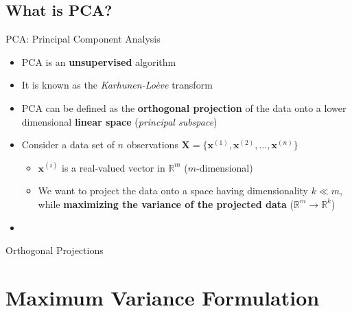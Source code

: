 \subsection{What is PCA?}

\begin{frame}{PCA: Principal Component Analysis}{}
	\begin{itemize}
		\item PCA is an \textbf{unsupervised} algorithm
		\item It is known as the \textit{Karhunen-Lo\`{e}ve} transform
		\item PCA can be defined as the \textbf{orthogonal projection} of the data onto a lower dimensional
			\textbf{linear space} (\textit{principal subspace})
		\item Consider a data set of $n$ observations $\bm{X} = \{ \bm{x}^{(1)}, \bm{x}^{(2)}, \dots, \bm{x}^{(n)} \}$
		\begin{itemize}
			\item $\bm{x}^{(i)}$ is a real-valued vector in $\mathbb{R}^m$ ($m$-dimensional)
			\item We want to project the data onto a space having dimensionality $k \ll m$, while \textbf{maximizing
				the variance of the projected data} ($\mathbb{R}^m \rightarrow \mathbb{R}^k$)
		\end{itemize}
		\item {}
	\end{itemize}
\end{frame}


\begin{frame}{Orthogonal Projections}{}
\end{frame}


\section{Maximum Variance Formulation}

